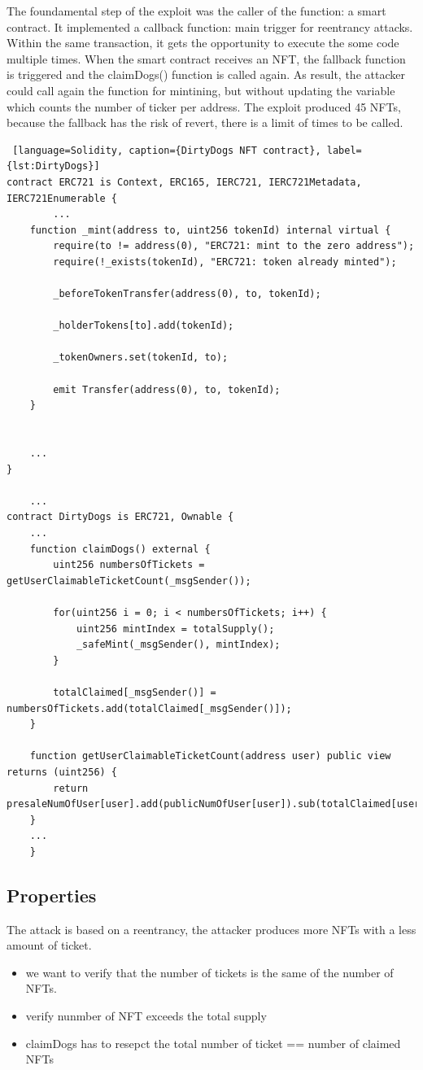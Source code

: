 The foundamental step of the exploit was the caller of the function: a smart contract. It implemented a 
callback function: main trigger for reentrancy attacks. 
Within the same transaction, it gets the opportunity to execute the some code multiple times. 
When the smart contract receives an NFT, the fallback function is triggered and the claimDogs() function is called again. 
As result, the attacker could call again the function for mintining, but without updating the variable which counts the number of ticker per address.
The exploit produced 45 NFTs, because the fallback has the risk of revert, 
there is a limit of times to be called.

    
\begin{lstlisting} [language=Solidity, caption={DirtyDogs NFT contract}, label={lst:DirtyDogs}]
contract ERC721 is Context, ERC165, IERC721, IERC721Metadata, IERC721Enumerable {
        ... 
    function _mint(address to, uint256 tokenId) internal virtual {
        require(to != address(0), "ERC721: mint to the zero address");
        require(!_exists(tokenId), "ERC721: token already minted");

        _beforeTokenTransfer(address(0), to, tokenId);

        _holderTokens[to].add(tokenId);

        _tokenOwners.set(tokenId, to);

        emit Transfer(address(0), to, tokenId);
    }


    ...
}
    
    ... 
contract DirtyDogs is ERC721, Ownable {
    ...
    function claimDogs() external {
        uint256 numbersOfTickets = getUserClaimableTicketCount(_msgSender());
        
        for(uint256 i = 0; i < numbersOfTickets; i++) {
            uint256 mintIndex = totalSupply();
            _safeMint(_msgSender(), mintIndex);
        }

        totalClaimed[_msgSender()] = numbersOfTickets.add(totalClaimed[_msgSender()]);
    }

    function getUserClaimableTicketCount(address user) public view returns (uint256) {
        return presaleNumOfUser[user].add(publicNumOfUser[user]).sub(totalClaimed[user]);
    }
    ...
    }
\end{lstlisting} 

\subsection{Properties}
\label{sec:DirtyDogs:Properties}
The attack is based on a reentrancy, the attacker produces more NFTs with a less amount of ticket.
\begin{itemize}
    \item we want to verify that the number of tickets is the same of the number of NFTs.
    \item verify nunmber of NFT exceeds the total supply 
    \item claimDogs has to resepct the total number of ticket == number of claimed NFTs
\end{itemize}
